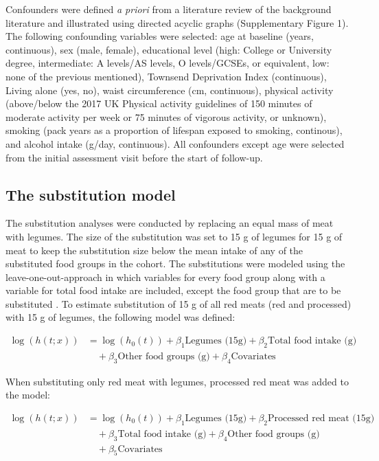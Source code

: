 \documentclass[sn-basic,Numbered,pdflatex]{sn-jnl}
\begin{document}
Confounders were defined \emph{a priori} from a literature review of the
background literature and illustrated using directed acyclic graphs
(Supplementary Figure 1). The following confounding variables were
selected: age at baseline (years, continuous), sex (male, female),
educational level (high: College or University degree, intermediate: A
levels/AS levels, O levels/GCSEs, or equivalent, low: none of the
previous mentioned), Townsend Deprivation Index (continuous), Living
alone (yes, no), waist circumference (cm, continuous), physical activity
(above/below the 2017 UK Physical activity guidelines of 150 minutes of
moderate activity per week or 75 minutes of vigorous activity, or
unknown), smoking (pack years as a proportion of lifespan exposed to
smoking, continous), and alcohol intake (g/day, continuous). All
confounders except age were selected from the initial assessment visit
before the start of follow-up.

\hypertarget{subsec5}{%
\subsection{The substitution model}\label{subsec5}}

The substitution analyses were conducted by replacing an equal mass of
meat with legumes. The size of the substitution was set to 15 g of
legumes for 15 g of meat to keep the substitution size below the mean
intake of any of the substituted food groups in the cohort. The
substitutions were modeled using the leave-one-out-approach in which
variables for every food group along with a variable for total food
intake are included, except the food group that are to be substituted
\citep{Ibsen2021}. To estimate substitution of 15 g of all red meats (red and
processed) with 15 g of legumes, the following model was defined:

\begin{align}
\log(h(t;x)) &= \log(h_0(t)) + \beta_1 \text{Legumes (15g)} + \beta_2 \text{Total food intake (g)} \nonumber \\
&\quad + \beta_3 \text{Other food groups (g)} + \beta_4 \text{Covariates}
\end{align}

\noindent When substituting only red meat with legumes, processed red
meat was added to the model:

\begin{align}
\log(h(t;x)) &= \log(h_0(t)) + \beta_1 \text{Legumes (15g)} + \beta_2 \text{Processed red meat (15g)} \nonumber \\
&\quad + \beta_3 \text{Total food intake (g)} + \beta_4 \text{Other food groups (g)} \nonumber \\
&\quad + \beta_5 \text{Covariates}
\end{align}
\end{document}
